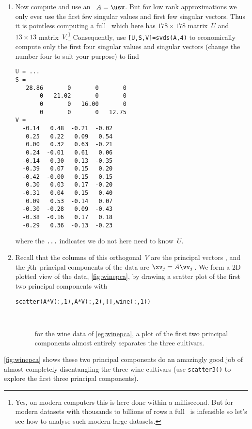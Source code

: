 \begin{example}
\begin{solution}
\begin{enumerate}
\item Now compute and use an \svd\ \(A=\usv\).
But for low rank approximations we only ever use the first few singular values and first few singular vectors.
Thus it is pointless computing a full \svd\ which here has \(178\times178\) matrix~\(U\) and \(13\times13\) matrix~\(V\).\footnote{Yes, on modern computers this is here done within a millisecond.  
But for modern datasets with thousands to billions of rows a full \svd\ is infeasible so let's see how to analyse such modern large datasets.}
Consequently, use \verb|[U,S,V]=svds(A,4)| to economically compute only the first four singular values and singular vectors (change the number four to suit your purpose) to find \twodp
\begin{verbatim}
U = ...
S =
   28.86       0       0       0
       0   21.02       0       0
       0       0   16.00       0
       0       0       0   12.75
V =
  -0.14   0.48  -0.21  -0.02
   0.25   0.22   0.09   0.54
   0.00   0.32   0.63  -0.21
   0.24  -0.01   0.61   0.06
  -0.14   0.30   0.13  -0.35
  -0.39   0.07   0.15   0.20
  -0.42  -0.00   0.15   0.15
   0.30   0.03   0.17  -0.20
  -0.31   0.04   0.15   0.40
   0.09   0.53  -0.14   0.07
  -0.30  -0.28   0.09  -0.43
  -0.38  -0.16   0.17   0.18
  -0.29   0.36  -0.13  -0.23
\end{verbatim}
where the \verb|...| indicates we do not here need to know~\(U\).

\item Recall that the columns of this orthogonal~\(V\) are the principal vectors \hlist{}, and the \(j\)th~principal components of the data are \(\xv_j=A\vv_j\)\,.
We form a 2D plotted view of the data, \autoref{fig:winepca}, by drawing a scatter plot of the first two principal components with 
\begin{verbatim}
scatter(A*V(:,1),A*V(:,2),[],wine(:,1))
\end{verbatim}
\begin{figure}
\centering
\\
\caption{for the wine data of \autoref{eg:winepca}, a plot of the first two principal components almost entirely separates the three cultivars.}
\label{fig:winepca}
\end{figure}
\end{enumerate}
\autoref{fig:winepca} shows these two principal components do an amazingly good job of almost completely disentangling the three wine cultivars (use \verb|scatter3()| to explore the first three principal components).
\end{solution}
\end{example}


